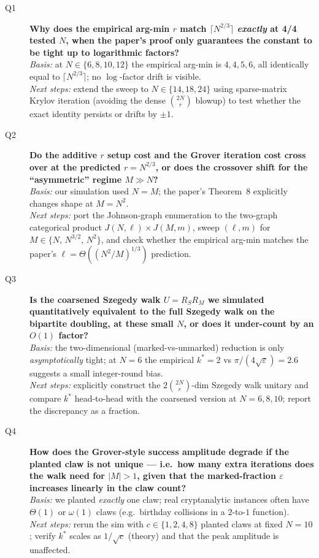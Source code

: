 \begin{description}
\item[Q1] \textbf{Why does the empirical arg-min $r$ match $\lceil N^{2/3}\rceil$ \emph{exactly} at 4/4 tested $N$, when the paper's proof only guarantees the constant to be tight up to logarithmic factors?}\\
\emph{Basis:} at $N\in\{6,8,10,12\}$ the empirical arg-min is $4,4,5,6$, all identically equal to $\lceil N^{2/3}\rceil$; no $\log$-factor drift is visible.\\
\emph{Next steps:} extend the sweep to $N\in\{14,18,24\}$ using sparse-matrix Krylov iteration (avoiding the dense $\binom{2N}{r}$ blowup) to test whether the exact identity persists or drifts by $\pm 1$.

\item[Q2] \textbf{Do the additive $r$ setup cost and the Grover iteration cost cross over at the predicted $r=N^{2/3}$, or does the crossover shift for the ``asymmetric'' regime $M\gg N$?}\\
\emph{Basis:} our simulation used $N=M$; the paper's Theorem~8 explicitly changes shape at $M=N^2$.\\
\emph{Next steps:} port the Johnson-graph enumeration to the two-graph categorical product $J(N,\ell)\times J(M,m)$, sweep $(\ell,m)$ for $M\in\{N,\,N^{3/2},\,N^2\}$, and check whether the empirical arg-min matches the paper's $\ell=\Theta((N^2/M)^{1/3})$ prediction.

\item[Q3] \textbf{Is the coarsened Szegedy walk $U=R_S R_M$ we simulated quantitatively equivalent to the full Szegedy walk on the bipartite doubling, at these small $N$, or does it under-count by an $O(1)$ factor?}\\
\emph{Basis:} the two-dimensional (marked-vs-unmarked) reduction is only \emph{asymptotically} tight; at $N=6$ the empirical $k^\ast=2$ vs $\pi/(4\sqrt{\varepsilon})=2.6$ suggests a small integer-round bias.\\
\emph{Next steps:} explicitly construct the $2\binom{2N}{r}$-dim Szegedy walk unitary and compare $k^\ast$ head-to-head with the coarsened version at $N=6,8,10$; report the discrepancy as a fraction.

\item[Q4] \textbf{How does the Grover-style success amplitude degrade if the planted claw is not unique --- i.e.\ how many extra iterations does the walk need for $|M|>1$, given that the marked-fraction $\varepsilon$ increases linearly in the claw count?}\\
\emph{Basis:} we planted \emph{exactly} one claw; real cryptanalytic instances often have $\Theta(1)$ or $\omega(1)$ claws (e.g.\ birthday collisions in a $2$-to-$1$ function).\\
\emph{Next steps:} rerun the sim with $c\in\{1,2,4,8\}$ planted claws at fixed $N=10$; verify $k^\ast$ scales as $1/\sqrt{c}$ (theory) and that the peak amplitude is unaffected.


\end{description}
